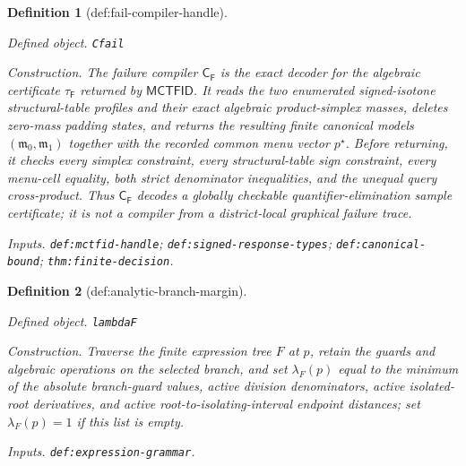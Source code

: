 \documentclass{article}
\newtheorem{definition}{Definition}
\begin{document}
\begin{definition}[def:fail-compiler-handle]\label{def:fail-compiler-handle}
\par\smallskip\noindent\emph{Defined object.} \texttt{Cfail}
\par\smallskip\noindent\emph{Construction.} The failure compiler \(\mathsf C_{\mathsf F}\) is the exact decoder for the algebraic certificate \(\tau_{\mathsf F}\) returned by \(\mathsf{MCTFID}\).  It reads the two enumerated signed-isotone structural-table profiles and their exact algebraic product-simplex masses, deletes zero-mass padding states, and returns the resulting finite canonical models \((\mathfrak m_0,\mathfrak m_1)\) together with the recorded common menu vector \(p^{\star}\).  Before returning, it checks every simplex constraint, every structural-table sign constraint, every menu-cell equality, both strict denominator inequalities, and the unequal query cross-product.  Thus \(\mathsf C_{\mathsf F}\) decodes a globally checkable quantifier-elimination sample certificate; it is not a compiler from a district-local graphical failure trace.
\par\smallskip\noindent\emph{Inputs.} \texttt{def:\allowbreak{}mctfid-\allowbreak{}handle}; \texttt{def:\allowbreak{}signed-\allowbreak{}response-\allowbreak{}types}; \texttt{def:\allowbreak{}canonical-\allowbreak{}bound}; \texttt{thm:\allowbreak{}finite-\allowbreak{}decision}.
\end{definition}

\begin{definition}[def:analytic-branch-margin]\label{def:analytic-branch-margin}
\par\smallskip\noindent\emph{Defined object.} \texttt{lambdaF}
\par\smallskip\noindent\emph{Construction.} Traverse the finite expression tree \(F\) at \(p\), retain the guards and algebraic operations on the selected branch, and set \(\lambda_F(p)\) equal to the minimum of the absolute branch-guard values, active division denominators, active isolated-root derivatives, and active root-to-isolating-interval endpoint distances; set \(\lambda_F(p)=1\) if this list is empty.
\par\smallskip\noindent\emph{Inputs.} \texttt{def:\allowbreak{}expression-\allowbreak{}grammar}.
\end{definition}
\end{document}
